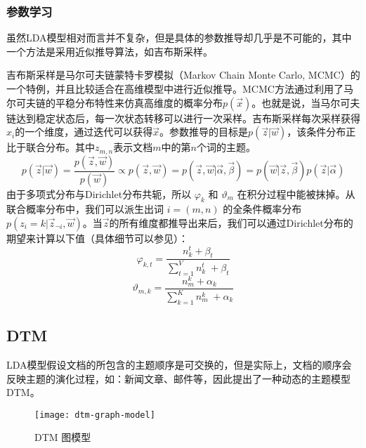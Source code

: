 \subsubsection{参数学习}
虽然LDA模型相对而言并不复杂，但是具体的参数推导却几乎是不可能的，其中一个方法是采用近似推导算法，如吉布斯采样\cite{griffiths2004finding}。\par
吉布斯采样是马尔可夫链蒙特卡罗模拟（Markov Chain Monte Carlo, MCMC）\cite{mackay2003information}的一个特例，并且比较适合在高维模型中进行近似推导。MCMC方法通过利用了马尔可夫链的平稳分布特性来仿真高维度的概率分布$p(\vec{x})$。也就是说，当马尔可夫链达到稳定状态后，每一次状态转移可以进行一次采样\cite{Walsh:2004}。吉布斯采样每次采样获得$x_i$的一个维度，通过迭代可以获得$\vec{x}$。参数推导的目标是$p(\vec{z}|\vec{w})$，该条件分布正比于联合分布。其中$z_{m,n}$表示文档$m$中的第$n$个词的主题。
\begin{equation}
p(\vec{z}|\vec{w})=\frac{p(\vec{z}, \vec{w})}{p(\vec{w})} \propto p(\vec{z}, \vec{w}) = p(\vec{z}, \vec{w}|\vec{\alpha},\vec{\beta}) = p(\vec{w}|\vec{z},\vec{\beta})p(\vec{z}|\vec{\alpha})
\end{equation}
由于多项式分布与Dirichlet分布共轭，所以 $\varphi_k$ 和 $\vartheta_m$ 在积分过程中能被抹掉。从联合概率分布中，我们可以派生出词 $i=(m,n)$ 的全条件概率分布$p(z_i=k|\vec{z}_{\neg i},\vec{w})$。当$\vec{z}$的所有维度都推导出来后，我们可以通过Dirichlet分布的期望来计算以下值（具体细节可以参见\cite{heinrich2005parameter}）：
\begin{equation}
\varphi_{k,t}=\frac{n_{k}^{t}+\beta_{t}}{\sum_{t=1}^{V}n_{k}^{t} \; +\beta_{t}}
\end{equation} 
\begin{equation}
\vartheta_{m,k}=\frac{n_{m}^{k}+\alpha_k}{\sum_{k=1}^{K}n_{m}^{k} \; +\alpha_k}
\end{equation} 

\subsection{DTM}
\label{intro-dtm}
LDA模型假设文档的所包含的主题顺序是可交换的，但是实际上，文档的顺序会反映主题的演化过程，如：新闻文章、邮件等，因此\cite{Blei:2006}提出了一种动态的主题模型DTM。
\begin{figure}[htb]
    \centering%
    \texttt{[image: dtm-graph-model]}
    \caption{DTM 图模型}
    \label{fig:dtm-graph-model}
\end{figure}


